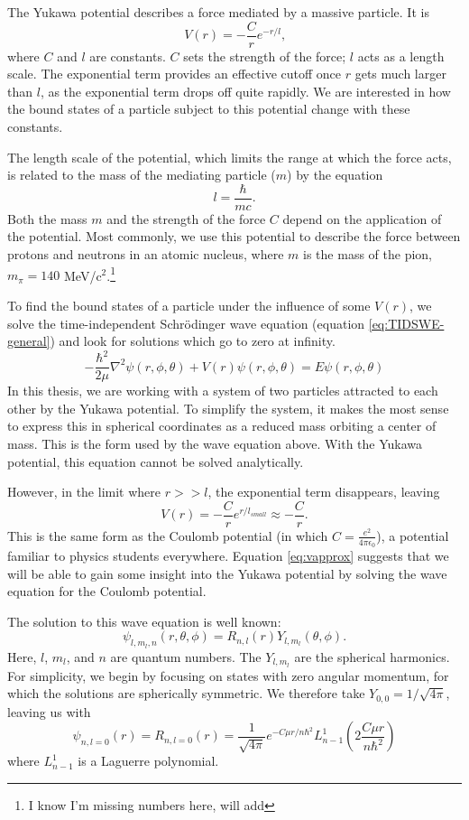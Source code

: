 \documentclass[12pt,twoside]{reedthesis}
\newcommand{\eqn}[1]{\begin{equation}#1\end{equation}}
\begin{document}
The Yukawa potential describes a force mediated by a massive particle. It is %
\eqn{
V(r) = -\frac{C}{r}e^{-r/l}\mbox{,}
}
where $C$ and $l$ are constants. $C$ sets the strength of the force; $l$ acts as a length scale. The exponential term provides an effective cutoff once $r$ gets much larger than $l$, as the exponential term drops off quite rapidly. We are interested in how the bound states of a particle subject to this potential change with these constants. 

The length scale of the potential, which limits the range at which the force acts, is related to the mass of the mediating particle ($m$) by the equation\eqn{
l = \frac{\hbar}{m c}\mbox{.}
}
Both the mass $m$ and the strength of the force $C$ depend on the application of the potential. Most commonly, we use this potential to describe the force between protons and neutrons in an atomic nucleus, where $m$ is the mass of the pion, $m_{\pi} = 140$ MeV/c$^2$.\footnote{I know I'm missing numbers here, will add}

To find the bound states of a particle under the influence of some $V(r)$, we solve the time-independent Schr\"odinger wave equation (equation \eqref{eq:TIDSWE-general}) and look for solutions which go to zero at infinity.
\eqn{
-\frac{\hbar^2}{2\mu}\nabla^2\psi(r,\phi,\theta) + V(r)\psi (r,\phi,\theta) = E \psi(r,\phi,\theta)
\label{eq:TIDSWE-general}
}
In this thesis, we are working with a system of two particles attracted to each other by the Yukawa potential. To simplify the system, it makes the most sense to express this in spherical coordinates as a reduced mass orbiting a center of mass. This is the form used by the wave equation above. With the Yukawa potential, this equation cannot be solved analytically. 

However, in the limit where $r >> l$, the exponential term disappears, leaving
\eqn{
V(r) = -\frac{C}{r}e^{r/l_{small}} \approx -\frac{C}{r}\mbox{.}
\label{eq:vapprox}
}
This is the same form as the Coulomb potential (in which $C = \frac{e^2}{4\pi\epsilon_0}$), a potential familiar to physics students everywhere. Equation \eqref{eq:vapprox} suggests that we will be able to gain some insight into the Yukawa potential by solving the wave equation for the Coulomb potential. 

The solution to this wave equation is well known:
\eqn{
\psi_{l, m_l, n} (r, \theta, \phi) = R_{n,l}(r) Y_{l,m_l}(\theta,\phi)\mbox{.}
}
Here, $l$, $m_l$, and $n$ are quantum numbers. The $Y_{l, m_l}$ are the spherical harmonics. For simplicity, we begin by focusing on states with zero angular momentum, for which the solutions are spherically symmetric. We therefore take $Y_{0,0} = 1/\sqrt{4 \pi}$, leaving us with
\eqn{
\psi_{n, l =0}(r) = R_{n , l= 0}(r) = \frac{1}{\sqrt{4\pi}} e^{-C \mu r / n \hbar^2}L^{1 }_{n-1} \left(2\frac{C \mu r}{n \hbar^2}\right)
\label{eq:SWE-coulomb}
}
where $L^{1}_{n-1}$ is a Laguerre polynomial. 
\end{document}
